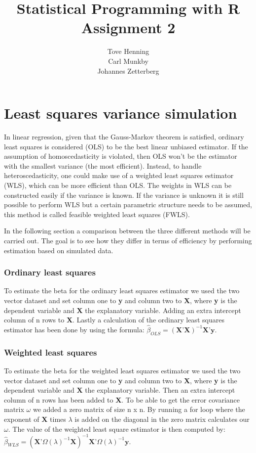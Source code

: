 \documentclass{article}\usepackage[]{graphicx}\usepackage[]{color}
\title{Statistical Programming with R\\Assignment 2}
\author{\small Tove Henning\\ \small Carl Munkby\\ \small Johannes Zetterberg}
\date{}
\begin{document}
\maketitle

\pagebreak

\section{Least squares variance simulation}

In linear regression, given that the Gauss-Markov theorem is satisfied, ordinary least squares is considered (OLS) to be the best linear unbiased estimator. If the assumption of homoscedasticity is violated, then OLS won’t be the estimator with the smallest variance (the most efficient). Instead, to handle heteroscedasticity, one could make use of a weighted least squares estimator (WLS), which can be more efficient than OLS. The weights in WLS can be constructed easily if the variance is known. If the variance is unknown it is still possible to perform WLS but a certain parametric structure needs to be assumed, this method is called feasible weighted least squares (FWLS).


In the following section a comparison between the three different methods will be carried out. The goal is to see how they differ in terms of efficiency by performing estimation based on simulated data.



\subsubsection*{Ordinary least squares}

To estimate the beta for the ordinary least squares estimator we used the two vector dataset and set column one to \textbf{y} and column two to \textbf{X}, where \textbf{y} is the dependent variable and \textbf{X} the explanatory variable. Adding an extra intercept column of n rows to \textbf{X}. Lastly a calculation of the ordinary least squares estimator has been done by using the formula:
$\hat{\beta}_{OLS}=(\textbf{X}’\textbf{X})^{-1}\textbf{X}’\textbf{y}$.



\subsubsection*{Weighted least squares}

To estimate the beta for the weighted least squares estimator we used the two vector dataset and set column one to \textbf{y} and column two to \textbf{X}, where \textbf{y} is the dependent variable and \textbf{X} the explanatory variable. Then an extra intercept column of n rows has been added to \textbf{X}. To be able to get the error covariance matrix $\omega$ we added a zero matrix of size n x n. By running a for loop where the exponent of \textbf{X} times $\lambda$ is added on the diagonal in the zero matrix calculates our $\omega$. The value of the weighted least square estimator is then computed by: 
$\hat{\beta}_{WLS}=(\textbf{X}’\Omega({\lambda})^{-1}\textbf{X})^{-1}\textbf{X}’\Omega({\lambda})^{-1}\textbf{y}$.
\end{document}
